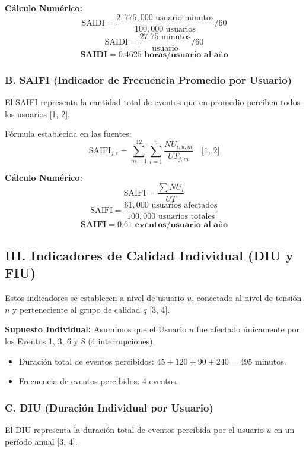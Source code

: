 \documentclass[a5paper]{book}%
\begin{document}
    \textbf{Cálculo Numérico:}
    $$\text{SAIDI} = \frac{2,775,000 \text{ usuario-minutos}}{100,000 \text{ usuarios}} / 60$$
    $$\text{SAIDI} = \frac{27.75 \text{ minutos}}{\text{usuario}} / 60$$
    $$\mathbf{\text{SAIDI} = 0.4625 \text{ horas/usuario al año}}$$
    
    \subsubsection*{B. SAIFI (Indicador de Frecuencia Promedio por Usuario)}
    
    El SAIFI representa la cantidad total de eventos que en promedio perciben todos los usuarios [1, 2].
    
    Fórmula establecida en las fuentes:
    $$\text{SAIFI}_{j,t} = \sum_{m=1}^{12} \sum_{i=1}^{n} \frac{NU_{i,u,m}}{UT_{j,m}} \quad \text{[1, 2]}$$
    
    \textbf{Cálculo Numérico:}
    $$\text{SAIFI} = \frac{\sum NU_{i}}{UT}$$
    $$\text{SAIFI} = \frac{61,000 \text{ usuarios afectados}}{100,000 \text{ usuarios totales}}$$
    $$\mathbf{\text{SAIFI} = 0.61 \text{ eventos/usuario al año}}$$
    
    \subsection*{III. Indicadores de Calidad Individual (DIU y FIU)}
    
    Estos indicadores se establecen a nivel de usuario $u$, conectado al nivel de tensión $n$ y perteneciente al grupo de calidad $q$ [3, 4].
    
    \textbf{Supuesto Individual:}
    Asumimos que el Usuario $u$ fue afectado únicamente por los Eventos 1, 3, 6 y 8 (4 interrupciones).
    \begin{itemize}
    	\item Duración total de eventos percibidos: $45 + 120 + 90 + 240 = 495$ minutos.
    	\item Frecuencia de eventos percibidos: 4 eventos.
    \end{itemize}
    
    \subsubsection*{C. DIU (Duración Individual por Usuario)}
    
    El DIU representa la duración total de eventos percibida por el usuario $u$ en un período anual [3, 4].
    
\end{document}
